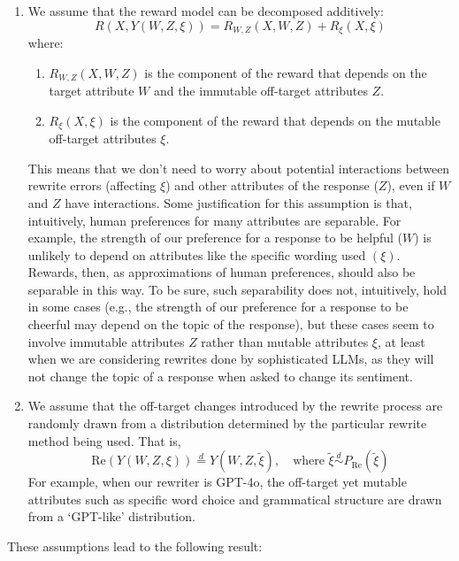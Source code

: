 \documentclass{article}
\theoremstyle{definition}
\newcommand{\equaldist}{\stackrel{d}{=}}
\newcommand{\dist}{\stackrel{d}{\sim}}
\begin{document}
\begin{enumerate}
  \item We assume that the reward model can be decomposed additively: 
    \[R(X, Y(W, Z, \xi)) = R_{W, Z}(X, W, Z) + R_{\xi}(X, \xi)\]
  where:
  \begin{enumerate}
    \item $R_{W,Z}(X, W, Z)$ is the component of the reward that depends on the target attribute $W$ and the immutable off-target attributes $Z$.
    \item $R_{\xi}(X, \xi)$ is the component of the reward that depends on the mutable off-target attributes $\xi$.
  \end{enumerate}
  This means that we don't need to worry about potential interactions between rewrite errors (affecting $\xi$) and other attributes of the response ($Z$), even if $W$ and $Z$ have interactions. Some justification for this assumption is that, intuitively, human preferences for many attributes are separable. For example, the strength of our preference for a response to be helpful ($W$) is unlikely to depend on attributes like the specific wording used $(\xi)$. Rewards, then, as approximations of human preferences, should also be separable in this way. To be sure, such separability does not, intuitively, hold in some cases (e.g., the strength of our preference for a response to be cheerful may depend on the topic of the response), but these cases seem to involve immutable attributes $Z$ rather than mutable attributes $\xi$, at least when we are considering rewrites done by sophisticated LLMs, as they will not change the topic of a response when asked to change its sentiment.

  \item We assume that the off-target changes introduced by the rewrite process are randomly drawn from a distribution determined by the particular rewrite method being used. That is,
    \[\text{Re}(Y(W, Z, \xi)) \equaldist Y(W, Z, \tilde{\xi}), \quad \text{where } \tilde{\xi} \dist P_\text{Re}(\tilde{\xi})\]
  For example, when our rewriter is GPT-4o, the off-target yet mutable attributes such as specific word choice and grammatical structure are drawn from a `GPT-like' distribution.
\end{enumerate}

These assumptions lead to the following result:
\end{document}
